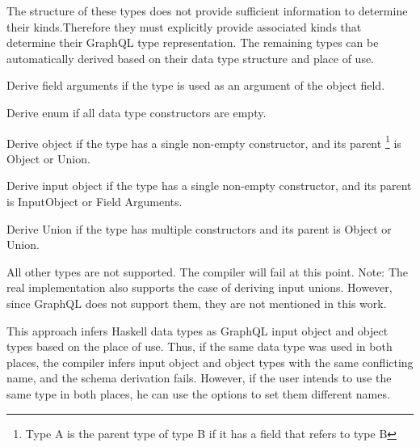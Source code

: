 \begin{enumerate}
   The structure of these types does not provide sufficient information to determine their kinds.Therefore they must explicitly provide associated kinds that determine their GraphQL type representation. The remaining types can be automatically derived based on their data type structure and place of use.
  
   Derive field arguments if the type is used as an argument of the object field. 

   Derive enum if all data type constructors are empty.

   Derive object if the type has a single non-empty constructor, and its parent \footnote{Type A is the parent type of type B if it has a field that refers to type B} is Object or Union. 
  
   Derive input object if the type has a single non-empty constructor, and its parent is InputObject or Field Arguments.

   Derive Union if the type has multiple constructors and its parent is Object or Union.

   All other types are not supported. The compiler will fail at this point. Note: The real implementation also supports the case of deriving input unions. However, since GraphQL does not support them, they are not mentioned in this work.

\end{enumerate}

This approach infers Haskell data types as GraphQL input object and object types based on the place of use. Thus, if the same data type was used in both places, the compiler infers input object and object types with the same conflicting name, and the schema derivation fails. However, if the user intends to use the same type in both places, he can use the   options to set them different names.